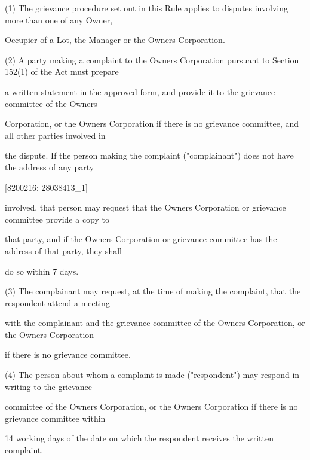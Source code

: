 \documentclass{article}
\begin{document}
{\fontsize{9.962}{1}(1) The grievance procedure set out in this Rule applies to disputes involving more than one of any Owner, }

{\fontsize{10.02}{1}Occupier of a Lot, the Manager or the Owners Corporation. }

{\fontsize{9.962}{1}(2) A party making a complaint to the Owners Corporation pursuant to Section 152(1) of the Act must prepare }

{\fontsize{10.02}{1}a written statement in the approved form, and provide it to the grievance committee of the Owners }

{\fontsize{10.02}{1}Corporation, or the Owners Corporation if there is no grievance committee, and all other parties involved in }

{\fontsize{10.02}{1}the dispute. If the person making the complaint ("complainant") does not have the address of any party }

\newpage
















{\fontsize{7.02}{1}[8200216: 28038413\_1] }

{\fontsize{10.02}{1}involved, that person may request that the Owners Corporation or grievance committee provide a copy to }

{\fontsize{10.02}{1}that party, and if the Owners Corporation or grievance committee has the address of that party, they shall }

{\fontsize{10.02}{1}do so within 7 days. }

{\fontsize{9.962}{1}(3) The complainant may request, at the time of making the complaint, that the respondent attend a meeting }

{\fontsize{10.02}{1}with the complainant and the grievance committee of the Owners Corporation, or the Owners Corporation }

{\fontsize{10.02}{1}if there is no grievance committee. }

{\fontsize{9.962}{1}(4) The person about whom a complaint is made ("respondent") may respond in writing to the grievance }

{\fontsize{10.02}{1}committee of the Owners Corporation, or the Owners Corporation if there is no grievance committee within }

{\fontsize{10.02}{1}14 working days of the date on which the respondent receives the written complaint. }
\end{document}
